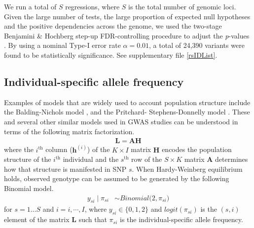 \documentclass[9pt,lineno]{elife}
\begin{document}
We run a total of $S$ regressions, where $S$ is the total number of genomic loci. Given the large number of tests, the large proportion of expected null hypotheses and the positive dependencies across the genome, we used the two-stage Benjamini \& Hochberg step-up FDR-controlling procedure to adjust the \textit{p}-values \citep{Benjamini2006}.
By using a nominal Type-I error rate $\alpha = 0.01$, a total of 24,390 variants were found to be statistically significance. 
See supplementary file  \ref{rsIDList}.

\subsection{Individual-specific allele frequency}
Examples of models that are widely used to account population structure include the Balding-Nichols model \citep{balding1995method}, and the Pritchard- Stephens-Donnelly model \citep{pritchard2000inference}. 
These and several other similar models used in GWAS studies can be understood in terms of the following matrix factorization. 
\begin{align}
\mathbf{L }= \mathbf{AH}
\end{align} 
where the $i^\text{th}$ column ($\boldsymbol{h}^{(i)}$) of the $K \times I$ matrix $\mathbf{H}$ encodes the population structure of the $i^\text{th}$ individual and the $s^\text{th}$ row of the $S \times K$ matrix $\mathbf{A}$ determines how that structure is manifested in SNP $s$. 
When Hardy-Weinberg equilibrium holds, observed genotype can be assumed to be generated by the following Binomial model.
\begin{align} \label{lfa}
y_{si} \mid \pi_{si}  &\sim Binomial\big( 2, \pi_{si} \big) 
\end{align} 
for $s=1\hdots S$ and $i=i,\cdots, I$, where $y_{si} \in \{0,1,2\}$ and $logit(\pi_{si})$ is the $(s,i)$ element of the matrix $\mathbf{L}$ such that  $\pi_{si}$ is the individual-specific allele frequency.
\end{document}
